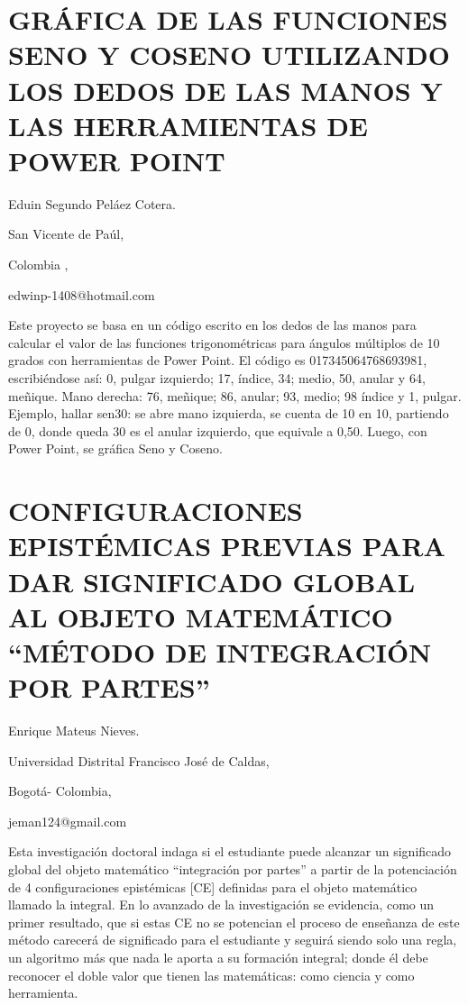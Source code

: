 \section{GRÁFICA DE LAS FUNCIONES SENO Y COSENO UTILIZANDO LOS DEDOS DE LAS
MANOS Y LAS HERRAMIENTAS DE POWER POINT}

\begin{datos}

Eduin Segundo Peláez Cotera.

San Vicente de Paúl,

Colombia ,

edwinp-1408@hotmail.com 

\end{datos}

Este proyecto se basa en un código escrito en los dedos de las manos
para calcular el valor de las funciones trigonométricas para ángulos
múltiplos de 10 grados con herramientas de Power Point. El código
es 017345064768693981, escribiéndose así: 0, pulgar izquierdo; 17,
índice, 34; medio, 50, anular y 64, meñique. Mano derecha: 76, meñique;
86, anular; 93, medio; 98 índice y 1, pulgar. Ejemplo, hallar sen30\textdegree{}:
se abre mano izquierda, se cuenta de 10\textdegree{} en 10\textdegree{},
partiendo de 0\textdegree{}, donde queda 30\textdegree{} es el anular
izquierdo, que equivale a 0,50. Luego, con Power Point, se gráfica
Seno y Coseno.


\section{CONFIGURACIONES EPISTÉMICAS PREVIAS PARA DAR SIGNIFICADO GLOBAL AL
OBJETO MATEMÁTICO “MÉTODO DE INTEGRACIÓN POR PARTES”}

\begin{datos}

Enrique Mateus Nieves.

Universidad Distrital Francisco José de Caldas,

Bogotá- Colombia,

jeman124@gmail.com

\end{datos}

Esta investigación doctoral indaga si el estudiante puede alcanzar
un significado global del objeto matemático “integración por partes”
a partir de la potenciación de 4 configuraciones epistémicas {[}CE{]}
definidas para el objeto matemático llamado la integral. En lo avanzado
de la investigación se evidencia, como un primer resultado, que si
estas CE no se potencian el proceso de enseñanza de este método carecerá
de significado para el estudiante y seguirá siendo solo una regla,
un algoritmo más que nada le aporta a su formación integral; donde
él debe reconocer el doble valor que tienen las matemáticas: como
ciencia y como herramienta. 


